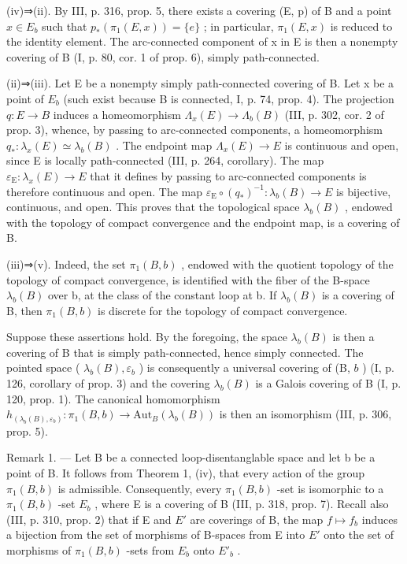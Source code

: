 (iv)⇒(ii). By III, p. 316, prop. 5, there exists a covering (E, p) of B and a point \(x \in E_{b}\) such that \(p_{*}(\pi_{1}(E, x)) = \{e\}\) ; in particular, \(\pi_{1}(E, x)\) is reduced to the identity element. The arc-connected component of x in E is then a nonempty covering of B (I, p. 80, cor. 1 of prop. 6), simply path-connected.

(ii)⇒(iii). Let E be a nonempty simply path-connected covering of B. Let x be a point of \(E_{b}\) (such exist because B is connected, I, p. 74, prop. 4). The projection \(q: E \to B\) induces a homeomorphism \(\Lambda_{x}(E) \to \Lambda_{b}(B)\) (III, p. 302, cor. 2 of prop. 3), whence, by passing to arc-connected components, a homeomorphism \(q_{*}: \lambda_{x}(E) \simeq \lambda_{b}(B)\) . The endpoint map \(\Lambda_{x}(E) \to E\) is continuous and open, since E is locally path-connected (III, p. 264, corollary). The map \(\varepsilon_{\mathrm{E}}: \lambda_{x}(E) \to E\) that it defines by passing to arc-connected components is therefore continuous and open. The map \(\varepsilon_{\mathrm{E}} \circ (q_{*})^{-1}: \lambda_{b}(B) \to E\) is bijective, continuous, and open. This proves that the topological space \(\lambda_{b}(B)\) , endowed with the topology of compact convergence and the endpoint map, is a covering of B.

(iii)⇒(v). Indeed, the set \(\pi_{1}(B,b)\) , endowed with the quotient topology of the topology of compact convergence, is identified with the fiber of the B-space \(\lambda_{b}(B)\) over b, at the class of the constant loop at b. If \(\lambda_{b}(B)\) is a covering of B, then \(\pi_{1}(B,b)\) is discrete for the topology of compact convergence.

Suppose these assertions hold. By the foregoing, the space \(\lambda_b(B)\) is then a covering of B that is simply path-connected, hence simply connected. The pointed space ( \(\lambda_b(B), \varepsilon_b\) ) is consequently a universal covering of (B, \(b\) ) (I, p. 126, corollary of prop. 3) and the covering \(\lambda_b(B)\) is a Galois covering of B (I, p. 120, prop. 1). The canonical homomorphism \(h_{(\lambda_b(B), \varepsilon_b)}: \pi_1(B, b) \to \text{Aut}_B(\lambda_b(B))\) is then an isomorphism (III, p. 306, prop. 5).

Remark 1. --- Let B be a connected loop-disentanglable space and let b be a point of B. It follows from Theorem 1, (iv), that every action of the group \(\pi_{1}(B,b)\) is admissible. Consequently, every \(\pi_{1}(B,b)\) -set is isomorphic to a \(\pi_{1}(B,b)\) -set \(E_{b}\) , where E is a covering of B (III, p. 318, prop. 7). Recall also (III, p. 310, prop. 2) that if E and \(E'\) are coverings of B, the map \(f \mapsto f_{b}\) induces a bijection from the set of morphisms of B-spaces from E into \(E'\) onto the set of morphisms of \(\pi_{1}(B,b)\) -sets from \(E_{b}\) onto \(E'_{b}\) .

